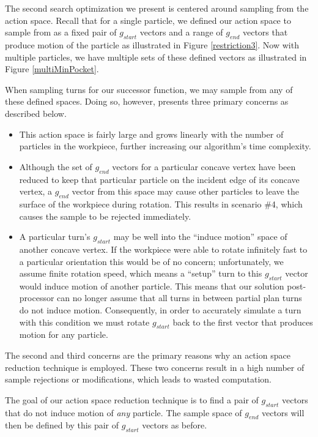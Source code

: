 The second search optimization we present is centered around sampling from the action space. Recall that for a single particle, we defined our action space to sample from as a fixed pair of $g_{start}$ vectors and a range of $g_{end}$ vectors that produce motion of the particle as illustrated in Figure \ref{restriction3}. Now with multiple particles, we have multiple sets of these defined vectors as illustrated in Figure \ref{multiMinPocket}.


When sampling turns for our successor function, we may sample from any of these defined spaces. Doing so, however, presents three primary concerns as described below.

\begin{itemize}
\item This action space is fairly large and grows linearly with the number of particles in the workpiece, further increasing our algorithm's time complexity.
\item Although the set of $g_{end}$ vectors for a particular concave vertex have been reduced to keep that particular particle on the incident edge of its concave vertex, a $g_{end}$ vector from this space may cause other particles to leave the surface of the workpiece during rotation. This results in scenario \#4, which causes the sample to be rejected immediately.
\item A particular turn's $g_{start}$ may be well into the ``induce motion'' space of another concave vertex. If the workpiece were able to rotate infinitely fast to a particular orientation this would be of no concern; unfortunately, we assume finite rotation speed, which means a ``setup'' turn to this $g_{start}$ vector would induce motion of another particle. This means that our solution post-processor can no longer assume that all turns in between partial plan turns do not induce motion. Consequently, in order to accurately simulate a turn with this condition we must rotate $g_{start}$ back to the first vector that produces motion for any particle.
\end{itemize}

The second and third concerns are the primary reasons why an action space reduction technique is employed. These two concerns result in a high number of sample rejections or modifications, which leads to wasted computation.

The goal of our action space reduction technique is to find a pair of $g_{start}$ vectors that do not induce motion of \emph{any} particle. The sample space of $g_{end}$ vectors will then be defined by this pair of $g_{start}$ vectors as before.

